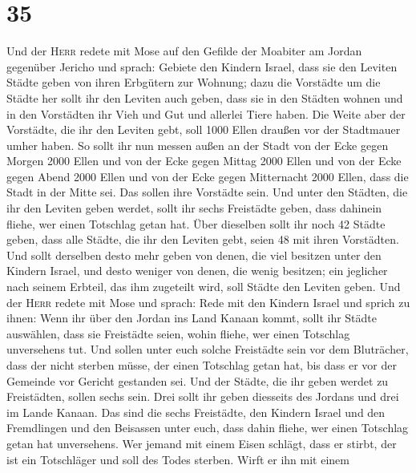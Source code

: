 \hypertarget{section-34}{%
\section{35}\label{section-34}}

 Und der \textsc{Herr} redete mit Mose auf den Gefilde der
Moabiter am Jordan gegenüber Jericho und sprach:  Gebiete
den Kindern Israel, dass sie den Leviten Städte geben von ihren
Erbgütern zur Wohnung;  dazu die Vorstädte um die Städte
her sollt ihr den Leviten auch geben, dass sie in den Städten wohnen und
in den Vorstädten ihr Vieh und Gut und allerlei Tiere haben.
 Die Weite aber der Vorstädte, die ihr den Leviten gebt,
soll 1000 Ellen draußen vor der Stadtmauer umher haben. 
So sollt ihr nun messen außen an der Stadt von der Ecke gegen Morgen
2000 Ellen und von der Ecke gegen Mittag 2000 Ellen und von der Ecke
gegen Abend 2000 Ellen und von der Ecke gegen Mitternacht 2000 Ellen,
dass die Stadt in der Mitte sei. Das sollen ihre Vorstädte sein.
 Und unter den Städten, die ihr den Leviten geben werdet,
sollt ihr sechs Freistädte geben, dass dahinein fliehe, wer einen
Totschlag getan hat. Über dieselben sollt ihr noch 42 Städte geben,
 dass alle Städte, die ihr den Leviten gebt, seien 48 mit
ihren Vorstädten.  Und sollt derselben desto mehr geben
von denen, die viel besitzen unter den Kindern Israel, und desto weniger
von denen, die wenig besitzen; ein jeglicher nach seinem Erbteil, das
ihm zugeteilt wird, soll Städte den Leviten geben.  Und
der \textsc{Herr} redete mit Mose und sprach:  Rede mit
den Kindern Israel und sprich zu ihnen: Wenn ihr über den Jordan ins
Land Kanaan kommt,  sollt ihr Städte auswählen, dass sie
Freistädte seien, wohin fliehe, wer einen Totschlag unversehens tut.
 Und sollen unter euch solche Freistädte sein vor dem
Bluträcher, dass der nicht sterben müsse, der einen Totschlag getan hat,
bis dass er vor der Gemeinde vor Gericht gestanden sei. 
Und der Städte, die ihr geben werdet zu Freistädten, sollen sechs sein.
 Drei sollt ihr geben diesseits des Jordans und drei im
Lande Kanaan.  Das sind die sechs Freistädte, den Kindern
Israel und den Fremdlingen und den Beisassen unter euch, dass dahin
fliehe, wer einen Totschlag getan hat unversehens.  Wer
jemand mit einem Eisen schlägt, dass er stirbt, der ist ein Totschläger
und soll des Todes sterben.  Wirft er ihn mit einem
